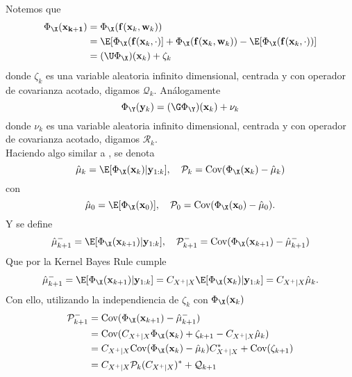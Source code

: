 Notemos que
\begin{equation*}
	\begin{aligned}
		\Phi_\X (\mathbf{x_{k+1}}) &= \Phi_\X (\mathbf{f}(\mathbf{x}_k, \mathbf{w}_k)) \\
		&= \E[\Phi_\X (\mathbf{f}(\mathbf{x}_k, \cdot)] + \Phi_\X (\mathbf{f}(\mathbf{x}_k, \mathbf{w}_k)) - \E[\Phi_\X (\mathbf{f}(\mathbf{x}_k, \cdot))] \\
		&= (\U \Phi_\X) (\mathbf{x}_k) + \zeta_k
	\end{aligned}
\end{equation*}
donde $\zeta_k$ es una variable aleatoria infinito dimensional, centrada y con operador de covarianza acotado, digamos $\mathcal{Q}_k$. Análogamente
\begin{equation*}
	\Phi_\Y (\mathbf{y}_k) = (\G \Phi_\Y) (\mathbf{x}_k) + \nu_k
\end{equation*}
donde $\nu_k$ es una variable aleatoria infinito dimensional, centrada y con operador de covarianza acotado, digamos $\mathcal{R}_k$. \\
Haciendo algo similar a \cite{Gebhard2019}, se denota
\begin{equation*}
	\hat{\mu}_k = \E [\Phi_\X (\mathbf{x}_k) | \mathbf{y}_{1:k}], \quad \mathcal{P}_{k} = \text{Cov}(\Phi_\X(\mathbf{x}_k) - \hat{\mu}_k)  
\end{equation*}
con 
\begin{equation*}
	\hat{\mu}_0 = \E [\Phi_\X (\mathbf{x}_0)], \quad \mathcal{P}_{0} = \text{Cov}(\Phi_\X (\mathbf{x}_0) - \hat{\mu}_0).
\end{equation*}
Y se define
\begin{equation*}
	\hat{\mu}_{k+1}^- = \E [\Phi_\X (\mathbf{x}_{k+1}) | \mathbf{y}_{1:k}], \quad \mathcal{P}_{k+1}^- = \text{Cov}(\Phi_\X (\mathbf{x}_{k+1}) - \hat{\mu}_{k+1}^-) 
\end{equation*}
Que por la Kernel Bayes Rule \cite{Fukumizu2013} cumple
\begin{equation*}
	\hat{\mu}_{k+1}^- = \E [\Phi_\X (\mathbf{x}_{k+1}) | \mathbf{y}_{1:k}] = C_{X^+|X} \E [\Phi_\X (\mathbf{x}_{k}) | \mathbf{y}_{1:k}] = C_{X^+|X} \hat{\mu}_k.
\end{equation*}
Con ello, utilizando la independiencia de $\zeta_k$ con $\Phi_\X (\mathbf{x}_k)$
\begin{equation*}
	\begin{aligned}
		\mathcal{P}_{k+1}^- &= \text{Cov}(\Phi_\X (\mathbf{x}_{k+1}) - \hat{\mu}_{k+1}^-)  \\
		&= \text{Cov}(C_{X^+|X}\Phi_\X (\mathbf{x}_{k}) + \zeta_{k+1} - C_{X^+|X}\hat{\mu}_{k}) \\
		&= C_{X^+|X} \text{Cov} (\Phi_\X (\mathbf{x}_{k}) - \hat{\mu}_{k} )C_{X^+|X}^* + \text{Cov}(\zeta_{k+1}) \\
		&= C_{X^+|X} \mathcal{P}_k (C_{X^+|X})^* + \mathcal{Q}_{k+1}
	\end{aligned}
\end{equation*}
